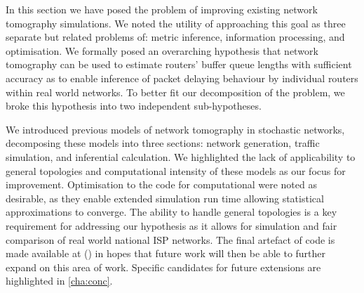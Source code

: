 In this section we have posed the problem of improving existing network tomography simulations. We noted the utility of approaching this goal as three separate but related problems of: metric inference, information processing, and optimisation. We formally posed an overarching hypothesis that network tomography can be used to estimate routers' buffer queue lengths with sufficient accuracy as to enable inference of packet delaying behaviour by individual routers within real world networks. To better fit our decomposition of the problem, we broke this hypothesis into two independent sub-hypotheses.\par
We introduced previous models of network tomography in stochastic networks, decomposing these models into three sections: network generation, traffic simulation, and inferential calculation. We highlighted the lack of applicability to general topologies and computational intensity of these models as our focus for improvement. 
Optimisation to the code for computational were noted as desirable, as they enable extended simulation run time allowing statistical approximations to converge. The ability to handle general topologies is a key requirement for addressing our hypothesis as it allows for simulation and fair comparison of real world national ISP networks. The final artefact of code is made available at (\cite{sylvester_millar_real_2021}) in hopes that future work will then be able to further expand on this area of work. Specific candidates for future extensions are highlighted in \cref{cha:conc}.